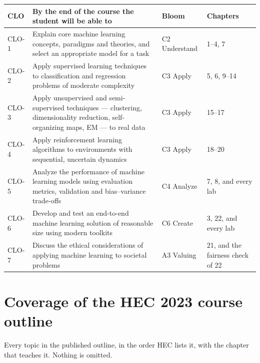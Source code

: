 \begin{longtable}{@{}L{1.3cm}L{7.6cm}L{2.1cm}L{3.8cm}@{}}
\toprule
{}
\textbf{CLO} & \textbf{By the end of the course the student will be able to} &
\textbf{Bloom} & \textbf{Chapters} \\
\midrule
\endhead
CLO-1 & Explain core machine learning concepts, paradigms and theories, and
select an appropriate model for a task & C2 Understand & 1--4, 7 \\
CLO-2 & Apply supervised learning techniques to classification and regression
problems of moderate complexity & C3 Apply & 5, 6, 9--14 \\
CLO-3 & Apply unsupervised and semi-supervised techniques --- clustering,
dimensionality reduction, self-organizing maps, EM --- to real data & C3 Apply &
15--17 \\
CLO-4 & Apply reinforcement learning algorithms to environments with sequential,
uncertain dynamics & C3 Apply & 18--20 \\
CLO-5 & Analyze the performance of machine learning models using evaluation
metrics, validation and bias--variance trade-offs & C4 Analyze & 7, 8, and every
lab \\
CLO-6 & Develop and test an end-to-end machine learning solution of reasonable
size using modern toolkits & C6 Create & 3, 22, and every lab \\
CLO-7 & Discuss the ethical considerations of applying machine learning to
societal problems & A3 Valuing & 21, and the fairness check of 22 \\
\bottomrule
\end{longtable}

\section*{Coverage of the HEC 2023 course outline}

Every topic in the published outline, in the order HEC lists it, with the
chapter that teaches it. Nothing is omitted.

